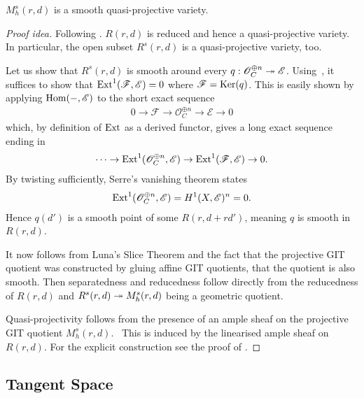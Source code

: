 \documentclass[12pt]{ociamthesis}  %
\begin{document}
\begin{theorem}\label{thm:lf_are_smooth}
  $M^s_h(r,d)$ is a smooth quasi-projective variety.
  \begin{proof}[Proof idea]
    Following \cite[Proposition 8.65]{hoskins2016}.
    $R(r,d)$ is reduced and hence a quasi-projective variety.
    In particular, the open subset $R^s(r,d)$ is a quasi-projective
    variety, too.

    Let us show that $R^s(r,d)$ is smooth around every
    $q : \mathscr O^{\oplus n}_C \twoheadrightarrow \mathscr E$. Using~\cite[Proposition 2.2.8]{huybrechts2010}, it suffices
    to show that $\operatorname{Ext}^1(\mathscr F,\mathscr E)=0$ where
    $\mathscr F = \operatorname{Ker}(q)$. This is easily shown by applying
    $\operatorname{Hom}(-,\mathscr E)$ to the short exact sequence
    \begin{align*}
      0 \to \mathscr F \to \mathscr O^{\oplus n}_C \to \mathscr E \to 0
    \end{align*}
    which, by definition of $\operatorname{Ext}$ as a derived functor, gives a
    long exact sequence ending in
    \begin{align*}
      \cdots
      \to \operatorname{Ext}^1(\mathscr O^{\oplus n}_C,\mathscr E)
      \to \operatorname{Ext}^1(\mathscr F,\mathscr E)
      \to 0.
    \end{align*}
    By twisting sufficiently, Serre's vanishing theorem
    states
    \begin{align*}
      \operatorname{Ext}^1(\mathscr O^{\oplus n}_C,\mathscr E) = H^1(X,\mathscr E)^n = 0.
    \end{align*}
    Hence $q(d')$ is a smooth point of some $R(r,d+rd')$, meaning $q$ is smooth
    in $R(r,d)$.

    It now follows from Luna's Slice Theorem and the fact that the
    projective GIT quotient was constructed by gluing affine GIT quotients,
    that the quotient is also smooth. Then separatedness and reducedness
    follow directly from the reducedness of $R(r,d)$ and
    $R^s(r,d)\twoheadrightarrow M^s_h(r,d)$ being a geometric quotient.

    Quasi-projectivity follows from the presence of an ample
    sheaf on the projective GIT quotient $M^s_h(r,d)$.~\cite[\href{https://stacks.math.columbia.edu/tag/0B42}{Tag 0B42}]{stacks-project}
    This is induced by the linearised ample sheaf on $R(r,d)$.
    For the explicit construction see the proof of
    \cite[Theorem 8.1]{dolgachev2003}.
  \end{proof}
\end{theorem}

\subsection{Tangent Space}
\end{document}
